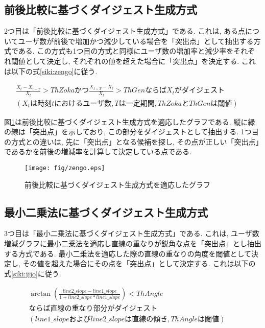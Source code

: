 \subsection{前後比較に基づくダイジェスト生成方式}
2つ目は「前後比較に基づくダイジェスト生成方式」である. これは, ある点についてユーザ数が前後で増加かつ減少している場合を「突出点」として抽出する方式である. この方式も1つ目の方式と同様にユーザ数の増加率と減少率をそれぞれ閾値として決定し, それぞれの値を超えた場合に「突出点」を決定する. これは以下の式\ref{siki:zengo}に従う.

\begin{eqnarray}
\frac{X_{t}-X_{t-T}}{X_{t}}>ThZokaかつ\frac{X_{t+T}-X_{t}}{X_{t}}>ThGenならばX_{t}がダイジェスト \nonumber \\
(X_{t}は時刻tにおけるユーザ数, Tは一定期間, ThZokaとThGenは閾値) &&
\label{siki:zengo}
\end{eqnarray}

図\ref{fig:zengo}は前後比較に基づくダイジェスト生成方式を適応したグラフである. 縦に緑の線は「突出点」を示しており, この部分をダイジェストとして抽出する. 1つ目の方式との違いは, 先に「突出点」となる候補を探し, その点が正しい「突出点」であるかを前後の増減率を計算して決定している点である.

\begin{figure}[h]
  \centering
  \texttt{[image: fig/zengo.eps]}
  \caption{前後比較に基づくダイジェスト生成方式を適応したグラフ}
  \label{fig:zengo}
\end{figure}

\subsection{最小二乗法に基づくダイジェスト生成方式}
3つ目は「最小二乗法に基づくダイジェスト生成方式」である. これは, ユーザ数増減グラフに最小二乗法を適応し直線の重なりが鋭角な点を「突出点」とし抽出する方式である. 最小二乗法を適応した際の直線の重なりの角度を閾値として決定し, その値を超えた場合にその点を「突出点」として決定する. これは以下の式\ref{siki:jijo}に従う.

\begin{eqnarray}
\arctan \left(\frac{line2\_slope - line1\_slope}{1+line2\_slope*line1\_slope}\right) < ThAngle \nonumber \\
ならば直線の重なり部分がダイジェスト \nonumber \\
(line1\_slopeおよびline2\_slopeは直線の傾き, ThAngleは閾値) &&
\label{siki:jijo}
\end{eqnarray}

